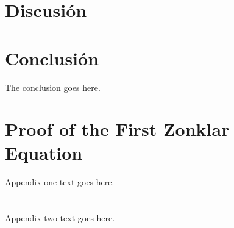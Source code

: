 \documentclass[conference,onecolumn,10pt]{IEEEtran}
\begin{document}
\section{Discusión}

\section{Conclusión}

The conclusion goes here.


\appendices
\section{Proof of the First Zonklar Equation}
Appendix one text goes here.

\section{}
Appendix two text goes here.



%
%
%
\printbibliography
\end{document}
